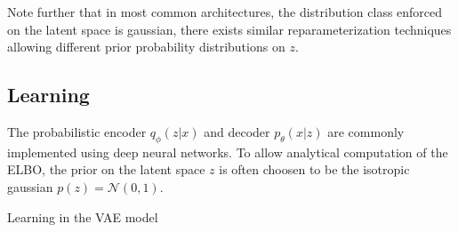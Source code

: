 Note further that in most common architectures, the distribution class enforced on the latent space is gaussian, there exists similar reparameterization techniques allowing different prior probability distributions on $z$.








\newpage

\subsection{Learning}
\label{sub:vae_learning}
The probabilistic encoder $q_\phi(z|x)$ and decoder $p_\theta(x|z)$ are commonly implemented using deep neural networks.
To allow analytical computation of the ELBO, the prior on the latent space $z$ is often choosen to be the isotropic gaussian $p(z) = \mathcal{N}(0,1)$.



\begin{algorithm}
  \caption{Learning in the VAE model}
  \label{alg:vae}
  \begin{algorithmic}[1]
    \EndWhile
  \end{algorithmic}
\end{algorithm}

